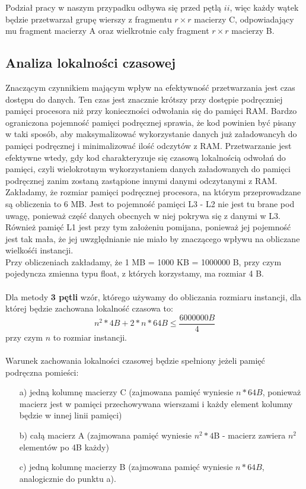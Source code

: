 \documentclass[10pt,a4paper]{article}
\begin{document}
Podział pracy w naszym przypadku odbywa się przed pętlą $ii$, więc każdy wątek będzie przetwarzał grupę wierszy z fragmentu $r \times r$ macierzy C, 
odpowiadający mu fragment macierzy A oraz wielkrotnie cały fragment $r \times r$ macierzy B.

\newpage

\subsection{Analiza lokalności czasowej}
Znaczącym czynnikiem mającym wpływ na efektywność przetwarzania jest czas dostępu do
danych. Ten czas jest znacznie krótszy przy dostępie podręczniej pamięci procesora niż
przy konieczności odwołania się do pamięci RAM. Bardzo ograniczona pojemność pamięci
podręcznej sprawia, że kod powinien być pisany w taki sposób, aby maksymalizować
wykorzystanie danych już załadowancyh do pamięci podręcznej i minimalizować ilość
odczytów z RAM. Przetwarzanie jest efektywne wtedy, gdy kod charakteryzuje się
czasową lokalnością odwołań do pamięci, czyli wielokrotnym wykorzystaniem danych załadowanych
do pamięci podręcznej zanim zostaną zastąpione innymi danymi odczytanymi z RAM.\\
Zakładamy, że rozmiar pamięci podręcznej procesora, na którym przeprowadzane są
obliczenia to 6 MB. Jest to pojemność pamięci L3 - L2 nie jest tu brane pod uwagę,
ponieważ część danych obecnych w niej pokrywa się z danymi w L3. Również pamięć L1
jest przy tym założeniu pomijana, ponieważ jej pojemność jest tak mała, że jej uwzględnianie
nie miało by znaczącego wpływu na obliczane wielkośći instancji.\\
Przy obliczeniach zakładamy, że 1 MB = 1000 KB = 1000000 B, przy czym pojedyncza zmienna typu
float, z których korzystamy, ma rozmiar 4 B.\\
\\
Dla metody \textbf{3 pętli} wzór, którego używamy do obliczania rozmiaru instancji, dla której
będzie zachowana lokalność czasowa to:
$$
n^2 * 4B + 2 * n * 64B \leq \frac{6000000B}{4}
$$
przy czym $n$ to rozmiar instancji.\\\\
Warunek zachowania lokalności czasowej będzie spełniony jeżeli pamięć podręczna pomieści:
\begin{enumerate} \itemsep0pt
	\item[a)] jedną kolumnę macierzy C (zajmowana pamięć wyniesie $n * 64B$, ponieważ macierz jest w pamięci 
	      przechowywana wierszami i każdy element kolumny będzie w innej linii pamięci)
	\item[b)] całą macierz A (zajmowana pamięć wyniesie $n^2 * 4$B - macierz zawiera $n^2$ elementów po 4B każdy)
	\item[c)] jedną kolumnę macierzy B (zajmowana pamięć wyniesie $n * 64B$, analogicznie do punktu a).
\end{enumerate}
\end{document}
